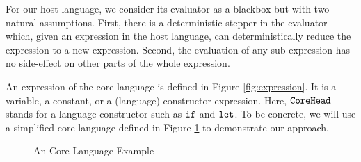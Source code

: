 For our host language, we consider its evaluator as a blackbox  but with two natural assumptions. First, there is a deterministic stepper in the evaluator which, given an expression in the host language, can deterministically reduce the expression to a new expression. Second, the evaluation of any sub-expression has no side-effect on other parts of the whole expression.

An expression of the core language is defined in Figure \ref{fig:expression}. It is a variable, a constant, or a (language) constructor expression. Here, $\mbox{\tt CoreHead}$ stands for a language constructor such as $\mbox{\tt if}$ and $\mbox{\tt let}$. To be concrete, we will use a simplified core language defined in Figure \ref{fig:core} to demonstrate our approach. 

\begin{figure}[t]
\begin{centering}
	\framebox[36em][c]{
		\parbox[t]{33em}{
			\[
			\begin{array}{lcl}
			\m{CoreExp} &::=& \Code{(CoreExp~CoreExp)} ~~\note{// apply}\\
			&|& \m{(lambda~(x)~CoreExp)} ~~\note{// call-by-value}\\
			&|& \m{(lambdaN~(x)~CoreExp)} ~~\note{// call-by-need}\\
			&|& \m{(if~CoreExp~CoreExp~CoreExp)}\\
			&|& \m{(let~(x~CoreExp)~CoreExp)}\\
			&|& \m{(first~CoreExp)}\\
			&|& \m{(empty~CoreExp)}\\
			&|& \m{(rest~CoreExp)}\\
			&|& \m{(cons~CoreExp~CoreExp)}\\
			&|& \m{(arithop~CoreExp~CoreExp)} ~~\note{// +, -, *, /, >, <, =}\\
			&|& \m{x}\\
			&|& \m{c} ~~\note{// boolean, number and list}
			\end{array}
			\]
		}
	}
\end{centering}
\caption{An Core Language Example}
\label{fig:core}
\end{figure}




